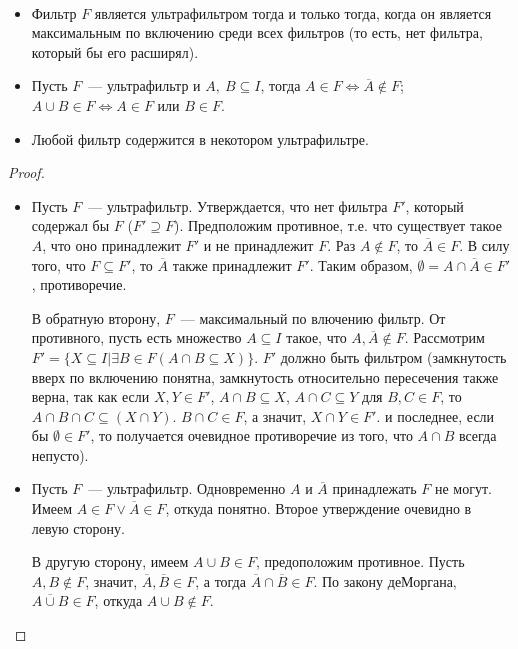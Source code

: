 \begin{stat} \ 
    \begin{itemize}
        \item Фильтр $F$ является ультрафильтром тогда и только тогда, когда он является максимальным по включению среди всех фильтров (то есть, нет фильтра, который бы его расширял). 
        \item Пусть $F$~— ультрафильтр и $A, \: B \subseteq I$, тогда $A \in F \Longleftrightarrow \overline{A} \notin F$; $A \cup B \in F \Longleftrightarrow A \in F$ или $B \in F$.
        \item Любой фильтр содержится в некотором ультрафильтре.
    \end{itemize}
\end{stat}

\begin{proof} \ 
    \begin{itemize}
        \item Пусть $F$~— ультрафильтр. Утверждается, что нет фильтра $F'$, который содержал бы $F$ ($F' \supseteq F$). Предположим противное, т.е. что существует такое $A$, что оно принадлежит $F'$ и не принадлежит $F$. Раз $A \notin F$, то $\overline{A} \in F$. В силу того, что $F \subseteq F'$, то $\overline{A}$ также принадлежит $F'$. Таким образом, $\emptyset = A \cap \overline{A} \in F'$, противоречие. 
        
        В обратную второну, $F$~— максимальный по влючению фильтр. От противного, пусть есть множество $A \subseteq I$ такое, что $A, \overline{A} \notin F$. Рассмотрим $F' = \{X \subseteq I | \exists B \in F (A \cap B \subseteq X)\}$. $F'$ должно быть фильтром (замкнутость вверх по включению понятна, замкнутость относительно пересечения также верна, так как если $X, Y \in F'$, $A \cap B \subseteq X$, $A \cap C \subseteq Y$ для $B, C \in F$, то $A \cap B \cap C \subseteq (X \cap Y)$. $B \cap C \in F$, а значит, $X \cap Y \in F'$. и последнее, если бы $\emptyset \in F'$, то получается очевидное противоречие из того, что $A \cap B$ всегда непусто). 
        
        \item Пусть $F$~— ультрафильтр. Одновременно $A$ и $\overline{A}$ принадлежать $F$ не могут. Имеем $A \in F \vee \overline{A} \in F$, откуда понятно. Второе утверждение очевидно в левую сторону.
        
        В другую сторону, имеем $A \cup B \in F$, предоположим противное. Пусть $A, B \notin F$, значит, $\overline{A}, \overline{B} \in F$, а тогда $\overline{A} \cap \overline{B} \in F$. По закону деМоргана, $\overline{A \cup B} \in F$, откуда $A \cup B \notin F$. 


\end{itemize}
\end{proof}
